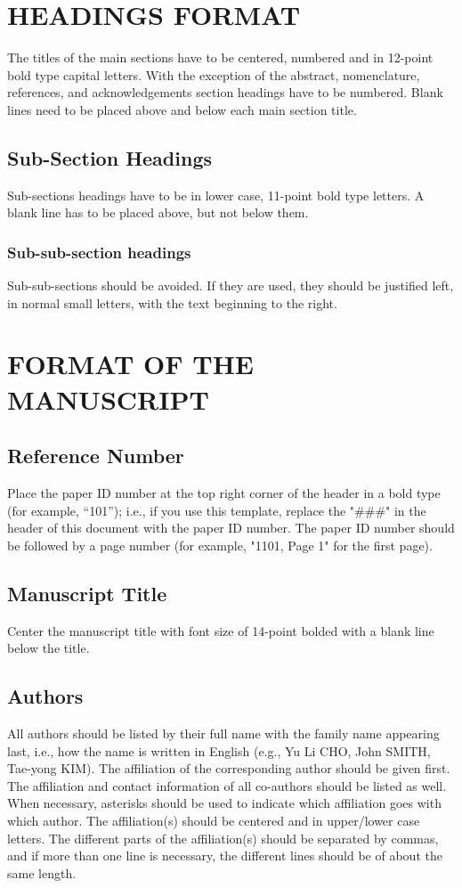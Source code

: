 \documentclass[10pt]{extarticle}
\begin{document}
\section{HEADINGS FORMAT}

The titles of the main sections have to be centered, numbered and in 12-point bold type capital letters.  With the exception of the abstract, nomenclature, references, and acknowledgements section headings have to be numbered. Blank lines need to be placed above and below each main section title.

\subsection{Sub-Section Headings}
Sub-sections headings have to be in lower case, 11-point bold type letters.  A blank line has to be placed above, but not below them.

\subsubsection{Sub-sub-section headings} Sub-sub-sections should be avoided. If they are used, they should be justified left, in normal small letters, with the text beginning to the right.

\section{FORMAT OF THE MANUSCRIPT}

\subsection{Reference Number}
Place the paper ID number at the top right corner of the header in a bold type (for example, “101”); i.e., if you use this template, replace the "\#\#\#" in the header of this document with the paper ID number. The paper ID number should be followed by a page number (for example, "1101, Page 1" for the first page). 

\subsection{Manuscript Title}
Center the manuscript title with font size of 14-point bolded with a blank line below the title.

\subsection{Authors}
All authors should be listed by their full name with the family name appearing last, i.e., how the name is written in English (e.g., Yu Li CHO, John SMITH, Tae-yong KIM). The affiliation of the corresponding author should be given first.  The affiliation and contact information of all co-authors should be listed as well.  When necessary, asterisks should be used to indicate which affiliation goes with which author.  The affiliation(s) should be centered and in upper/lower case letters.  The different parts of the affiliation(s) should be separated by commas, and if more than one line is necessary, the different lines should be of about the same length.
\end{document}
